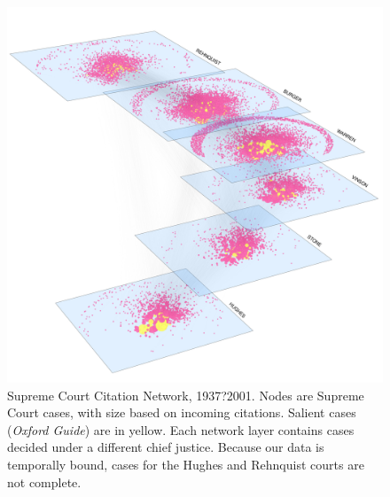 \documentclass[headsepline=true, abstracton]{scrartcl}
\begin{document}
\begin{figure}[htp]
\includegraphics[scale=0.35,clip=true,trim=.5cm 0cm 0cm 2cm]{images/citations1}
\caption{ Supreme Court Citation Network, 1937?2001. Nodes are Supreme Court cases, with size based on incoming citations. Salient cases ({\em Oxford Guide}) are in yellow. Each network layer contains cases decided under a different chief justice. Because our data is temporally bound, cases for the Hughes and Rehnquist courts are not complete. }
 \label{fig:networkviz}
\vspace{-.25cm}
\end{figure}

  
\end{document}
